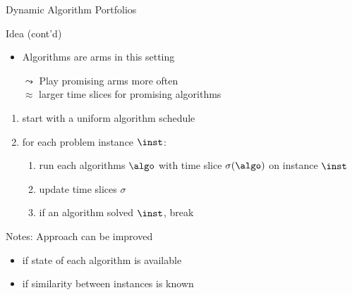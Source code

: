\begin{frame}[c]{Dynamic Algorithm Portfolios~}

\begin{block}{Idea (cont'd)}
\begin{itemize}
  \item Algorithms are arms in this setting
  \item[$\leadsto$] Play promising arms more often\\ $\approx$ larger time slices for promising algorithms  
\end{itemize}

\pause

\begin{enumerate}
  \item start with a uniform algorithm schedule
  \item for each problem instance $\inst$:
  \begin{enumerate}
    \item run each algorithms $\algo$ with time slice $\sigma(\algo)$ on instance $\inst$
    \item update time slices $\sigma$
    \item if an algorithm solved $\inst$, break
  \end{enumerate}
\end{enumerate}

\pause

Notes: Approach can be improved 
\begin{itemize}
  \item if state of each algorithm is available 
  \item if similarity between instances is known
\end{itemize}

\end{block}


\end{frame}
